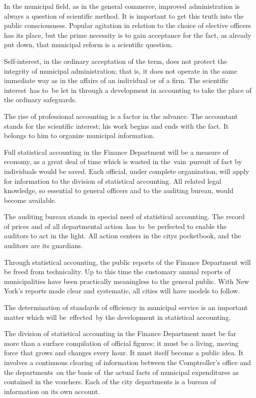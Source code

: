 \documentclass[twoside,symmetric,nobib,justified]{tufte-book}
\begin{document}
In the municipal field, as in the general commerce, improved
administration is always a question of scientific method. It is
important to get this truth into the public consciousness. Popular
agitation in relation to the choice of elective officers has its place,
but the prime necessity is to gain acceptance for the fact, as already
put down, that municipal reform is a scientific question.~

Self-interest, in the ordinary acceptation of the term, does not protect
the integrity of municipal administration; that is, it does not operate
in the same immediate way as in the affairs of an individual or of a
firm. The scientific interest~has to~be let in through a development in
accounting to take the place of the ordinary safeguards.~

The rise of professional accounting is a factor in the advance. The
accountant stands for the scientific interest; his work begins and ends
with the fact. It belongs to him to organize municipal information.~

Full statistical accounting in the Finance Department will be a measure
of economy, as a great deal of time which is wasted in the~vain~pursuit
of fact by individuals would be saved. Each official, under complete
organization, will apply for information to the division of statistical
accounting. All related legal knowledge, so essential to general
officers and to the auditing bureau, would become available.~

The auditing bureau stands in special need of statistical accounting.
The record of prices and of all departmental action~has to~be perfected
to enable the auditors to act in the light. All action centers in the
city\textquotesingle s pocketbook, and the auditors are its guardians.~

Through statistical accounting, the public reports of the Finance
Department will be freed from technicality. Up to this time the
customary annual reports of municipalities have been practically
meaningless to the general public. With New York's reports made clear
and systematic, all cities will have models to follow.~

The determination of standards of efficiency in municipal service is an
important matter which will be~effected~by the development in
statistical accounting.

The division of statistical accounting in the Finance Department must be
far more than a surface compilation of official figures; it must be a
living, moving force that grows and changes every hour. It must itself
become a public idea. It involves a continuous clearing of information
between the Comptroller's office and the departments~on the basis of~the
actual facts of municipal expenditures as contained in the vouchers.
Each of the city departments is a bureau of information on its own
account.
\end{document}
